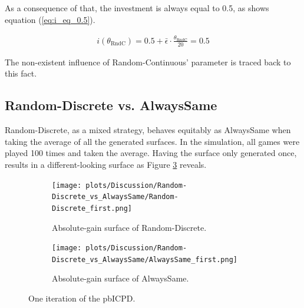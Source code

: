\documentclass{article}
\begin{document}
	As a consequence of that, the investment is always equal to 0.5, as shows equation (\ref{eq:i_eq_0.5}).

	\begin{equation}
		\begin{split}
			i(\theta_{\mathrm{RndC}}) = 0.5 + \bar \epsilon \cdot \frac{\theta_{\mathrm{RndC}}}{20} = 0.5
		\end{split}
		\label{eq:i_eq_0.5}
	\end{equation}

	The non-existent influence of Random-Continuous' parameter is traced back to this fact.


\subsection{Random-Discrete vs. AlwaysSame} \label{sec:RndD_vs_AlwS}
	
	Random-Discrete, as a mixed strategy, behaves equitably as AlwaysSame when taking the average of all the generated surfaces.
	In the simulation, all games were played 100 times and taken the average.
	Having the surface only generated once, results in a different-looking surface as Figure \ref{fig:two_one-iter} reveals.\\

	\begin{figure}[h]
		\centering
		\begin{subfigure}[t]{0.45\textwidth}
			\centering
			\texttt{[image: plots/Discussion/Random-Discrete\_vs\_AlwaysSame/Random-Discrete\_first.png]}
			\caption{Absolute-gain surface of Random-Discrete.}
			\label{fig:RNDD_one-iter}
		\end{subfigure}\hfill
		\begin{subfigure}[t]{0.45\textwidth}
			\centering
			\texttt{[image: plots/Discussion/Random-Discrete\_vs\_AlwaysSame/AlwaysSame\_first.png]}\\
			\caption{Absolute-gain surface of AlwaysSame.}
			\label{fig:ALWS_one-iter}
		\end{subfigure}
		\caption{One iteration of the pbICPD.}
		\label{fig:two_one-iter}
	\end{figure}
\end{document}
